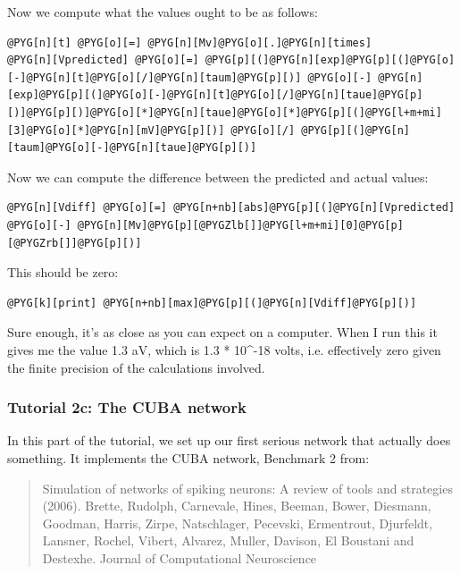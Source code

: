 \documentclass[letterpaper,10pt,english]{manual}
\begin{document}
Now we compute what the values ought to be as follows:

\begin{Verbatim}[commandchars=@\[\]]
@PYG[n][t] @PYG[o][=] @PYG[n][Mv]@PYG[o][.]@PYG[n][times]
@PYG[n][Vpredicted] @PYG[o][=] @PYG[p][(]@PYG[n][exp]@PYG[p][(]@PYG[o][-]@PYG[n][t]@PYG[o][/]@PYG[n][taum]@PYG[p][)] @PYG[o][-] @PYG[n][exp]@PYG[p][(]@PYG[o][-]@PYG[n][t]@PYG[o][/]@PYG[n][taue]@PYG[p][)]@PYG[p][)]@PYG[o][*]@PYG[n][taue]@PYG[o][*]@PYG[p][(]@PYG[l+m+mi][3]@PYG[o][*]@PYG[n][mV]@PYG[p][)] @PYG[o][/] @PYG[p][(]@PYG[n][taum]@PYG[o][-]@PYG[n][taue]@PYG[p][)]
\end{Verbatim}

Now we can compute the difference between the predicted and actual values:

\begin{Verbatim}[commandchars=@\[\]]
@PYG[n][Vdiff] @PYG[o][=] @PYG[n+nb][abs]@PYG[p][(]@PYG[n][Vpredicted] @PYG[o][-] @PYG[n][Mv]@PYG[p][@PYGZlb[]]@PYG[l+m+mi][0]@PYG[p][@PYGZrb[]]@PYG[p][)]
\end{Verbatim}

This should be zero:

\begin{Verbatim}[commandchars=@\[\]]
@PYG[k][print] @PYG[n+nb][max]@PYG[p][(]@PYG[n][Vdiff]@PYG[p][)]
\end{Verbatim}

Sure enough, it's as close as you can expect on a computer. When I run this
it gives me the value 1.3 aV, which is 1.3 * 10\textasciicircum{}-18 volts, i.e. effectively
zero given the finite precision of the calculations involved.

\resetcurrentobjects
\hypertarget{--doc-tutorial_2c_the_cuba_network}{}

\subsubsection{Tutorial 2c: The CUBA network}

In this part of the tutorial, we set up our first serious network
that actually does something. It implements the CUBA network, Benchmark 2 from:
\begin{quote}

Simulation of networks of spiking neurons: A review of tools and strategies (2006).
Brette, Rudolph, Carnevale, Hines, Beeman, Bower, Diesmann, Goodman, Harris, Zirpe,
Natschlager, Pecevski, Ermentrout, Djurfeldt, Lansner, Rochel, Vibert, Alvarez, Muller,
Davison, El Boustani and Destexhe.
Journal of Computational Neuroscience
\end{quote}
\end{document}

